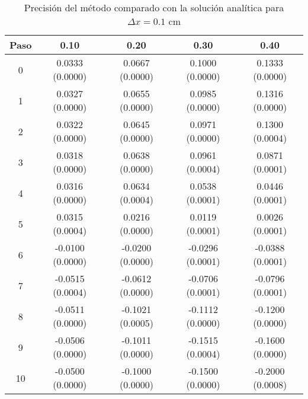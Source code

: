 \documentclass[11pt]{article}
\begin{document}
\begin{table}
\center
\begin{tabular}{ c c c c c }
\hline
Paso & 0.10 & 0.20 & 0.30 & 0.40 \\
\hline
\hline
0 & 0.0333 (0.0000) & 0.0667 (0.0000) & 0.1000 (0.0000) & 0.1333 (0.0000) \\
1 & 0.0327 (0.0000) & 0.0655 (0.0000) & 0.0985 (0.0000) & 0.1316 (0.0000) \\
2 & 0.0322 (0.0000) & 0.0645 (0.0000) & 0.0971 (0.0000) & 0.1300 (0.0004) \\
3 & 0.0318 (0.0000) & 0.0638 (0.0000) & 0.0961 (0.0004) & 0.0871 (0.0001) \\
4 & 0.0316 (0.0000) & 0.0634 (0.0004) & 0.0538 (0.0001) & 0.0446 (0.0001) \\
5 & 0.0315 (0.0004) & 0.0216 (0.0000) & 0.0119 (0.0001) & 0.0026 (0.0001) \\
6 & -0.0100 (0.0000) & -0.0200 (0.0000) & -0.0296 (0.0001) & -0.0388 (0.0001) \\
7 & -0.0515 (0.0004) & -0.0612 (0.0000) & -0.0706 (0.0001) & -0.0796 (0.0001) \\
8 & -0.0511 (0.0000) & -0.1021 (0.0005) & -0.1112 (0.0000) & -0.1200 (0.0000) \\
9 & -0.0506 (0.0000) & -0.1011 (0.0000) & -0.1515 (0.0004) & -0.1600 (0.0000) \\
10 & -0.0500 (0.0000) & -0.1000 (0.0000) & -0.1500 (0.0000) & -0.2000 (0.0008) \\
\end{tabular}
\caption{Precisión del método comparado con la solución analítica para $\Delta{x} = 0.1$ cm}
\label{tab:comparativa2}
\end{table}
\end{document}
